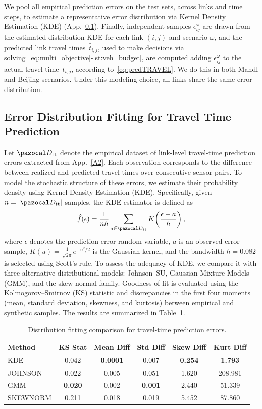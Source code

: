 \documentclass[a4paper,fleqn]{cas-sc}
\begin{document}
We pool all empirical prediction errors on the test sets, across links and time steps, to estimate a representative error distribution via Kernel Density Estimation (KDE) (App.~\ref{A3}). Finally, independent samples $\epsilon_{ij}^{\omega}$ are drawn from the estimated distribution KDE for each link $(i,j)$ and scenario $\omega$, and the predicted link travel times~$\hat t_{i,j}$, used to make decisions via solving~\eqref{eq:multi_objective}-\eqref{st:veh_budget}, are computed adding $\epsilon_{ij}^{\omega}$ to the actual travel time~$t_{i,j}$, according to~\eqref{eq:predTRAVEL}. We do this in both Mandl and Beijing scenarios.
Under this modeling choice, all links share the same error distribution.

\subsection{Error Distribution Fitting for Travel Time Prediction}\label{A3}
Let $\pazocal D_{\text{tt}}$ denote the empirical dataset of link-level travel-time prediction errors extracted from App.~\ref{A2}.
Each observation corresponds to the difference between realized and predicted travel times over consecutive sensor pairs.
%
To model the stochastic structure of these errors, we estimate their probability density using Kernel Density Estimation (KDE).
Specifically, given $n = |\pazocal D_{\text{tt}}|$ samples, the KDE estimator is defined as
\begin{equation}
\hat f(\epsilon)
=\frac{1}{n h}
\sum_{a\in\pazocal D_{\text{tt}}}
K\!\left(\frac{\epsilon-a}{h}\right),
\label{eq:PDF_occRATE}
\end{equation}
where $\epsilon$ denotes the prediction-error random variable, $a$ is an observed error sample,
$K(u)=\frac{1}{\sqrt{2\pi}}e^{-u^{2}/2}$ is the Gaussian kernel, and
the bandwidth $h=0.082$ is selected using Scott’s rule.
%
To assess the adequacy of KDE, we compare it with three alternative distributional models:
Johnson~SU, Gaussian Mixture Models (GMM), and the skew-normal family.
Goodness-of-fit is evaluated using the Kolmogorov--Smirnov (KS) statistic and discrepancies in the first four moments
(mean, standard deviation, skewness, and kurtosis) between empirical and synthetic samples.
The results are summarized in Table~\ref{tab:dist_comparison}.
%
\begin{table}[h]
\centering
\small
\begin{tabular}{lccccc}
\toprule
Method   & KS Stat & Mean Diff & Std Diff & Skew Diff & Kurt Diff \\
\midrule
KDE      & 0.042   & \textbf{0.0001} & 0.007 & \textbf{0.254} & \textbf{1.793} \\
JOHNSON  & 0.022   & 0.005           & 0.051 & 1.620          & 208.981        \\
GMM      & \textbf{0.020} & 0.002   & \textbf{0.001} & 2.440 & 51.339 \\
SKEWNORM & 0.211   & 0.018           & 0.019 & 5.452          & 87.860         \\
\bottomrule
\end{tabular}
\caption{Distribution fitting comparison for travel-time prediction errors.}
\label{tab:dist_comparison}
\end{table}
\end{document}
